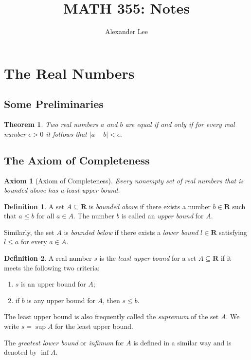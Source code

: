 \documentclass{amsart}
\title{MATH 355: Notes}
\author{Alexander Lee}
\newtheorem*{theorem}{Theorem}
\newtheorem*{axiom}{Axiom}
\theoremstyle{definition}
\newtheorem*{definition}{Definition}
\newcommand{\R}{\mathbf{R}}
\newcommand{\abs}[1]{|#1|}
\begin{document}
\maketitle

\section*{The Real Numbers}

\subsection*{Some Preliminaries}

\begin{theorem}
  Two real numbers $a$ and $b$ are equal if and only if for every real number
  $\epsilon > 0$ it follows that $\abs{a-b} < \epsilon$.
\end{theorem}

\subsection*{The Axiom of Completeness}

\begin{axiom}[Axiom of Completeness]
  Every nonempty set of real numbers that is bounded above has a least upper
  bound.
\end{axiom}

\begin{definition}
  A set $A \subseteq \R$ is \emph{bounded above} if there exists a number $b \in
  \R$ such that $a \le b$ for all $a \in A$. The number $b$ is called an
  \emph{upper bound} for $A$.

  Similarly, the set $A$ is \emph{bounded below} if there exists a \emph{lower
  bound} $l \in \R$ satisfying $l \le a$ for every $a \in A$.
\end{definition}

\begin{definition}
  A real number $s$ is the \emph{least upper bound} for a set $A \subseteq \R$
  if it meets the following two criteria:
  \begin{enumerate}
    \item $s$ is an upper bound for $A$;
    \item if $b$ is any upper bound for $A$, then $s \le b$.
  \end{enumerate}
  The least upper bound is also frequently called the \emph{supremum} of the set
  $A$. We write $s = \sup{A}$ for the least upper bound.

  The \emph{greatest lower bound} or \emph{infimum} for $A$ is defined in a
  similar way and is denoted by $\inf{A}$.
\end{definition}
\end{document}
